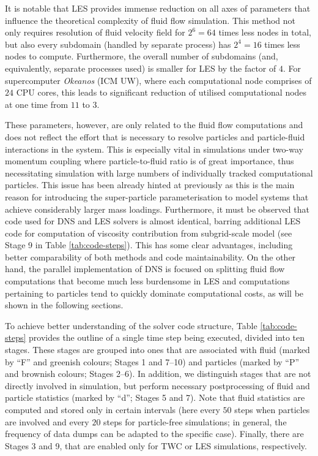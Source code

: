 \documentclass{pracamgren}
\begin{document}
It is notable that LES provides immense reduction on all axes of parameters that influence the theoretical complexity of fluid flow simulation.
This method not only requires resolution of fluid velocity field for ${2^6 = 64}$ times less nodes in total, but also every subdomain (handled by separate process) has ${2^4 = 16}$ times less nodes to compute.
Furthermore, the overall number of subdomains (and, equivalently, separate processes used) is smaller for LES by the factor of $4$.
For supercomputer \emph{Okeanos} (ICM UW), where each computational node comprises of $24$ CPU cores, this leads to significant reduction of utilised computational nodes at one time from $11$ to $3$.

These parameters, however, are only related to the fluid flow computations and does not reflect the effort that is necessary to resolve particles and particle-fluid interactions in the system.
This is especially vital in simulations under two-way momentum coupling where particle-to-fluid ratio is of great importance, thus necessitating simulation with large numbers of individually tracked computational particles.
This issue has been already hinted at previously as this is the main reason for introducing the super-particle parameterisation to model systems that achieve considerably larger mass loadings.
Furthermore, it must be observed that code used for DNS and LES solvers is almost identical, barring additional LES code for computation of viscosity contribution from subgrid-scale model (see Stage 9 in Table \ref{tab:code-steps}).
This has some clear advantages, including better comparability of both methods and code maintainability.
On the other hand, the parallel implementation of DNS is focused on splitting fluid flow computations that become much less burdensome in LES and computations pertaining to particles tend to quickly dominate computational costs, as will be shown in the following sections.

\medskip

To achieve better understanding of the solver code structure, Table \ref{tab:code-steps} provides the outline of a single time step being executed, divided into ten stages.
These stages are grouped into ones that are associated with fluid (marked by ``F'' and greenish colours; Stages 1 and 7--10) and particles (marked by ``P'' and brownish colours; Stages 2--6).
In addition, we distinguish stages that are not directly involved in simulation, but perform necessary postprocessing of fluid and particle statistics (marked by ``d''; Stages 5 and 7).
Note that fluid statistics are computed and stored only in certain intervals (here every $50$ steps when particles are involved and every $20$ steps for particle-free simulations; in general, the frequency of data dumps can be adapted to the specific case).
Finally, there are Stages 3 and 9, that are enabled only for TWC or LES simulations, respectively.
\end{document}
